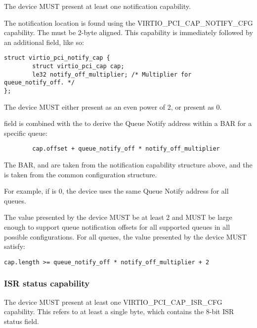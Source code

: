 The device MUST present at least one notification capability.

The notification location is found using the VIRTIO_PCI_CAP_NOTIFY_CFG
capability.  The  must be 2-byte aligned.  This capability is immediately followed by an additional
field, like so:

\begin{lstlisting}
struct virtio_pci_notify_cap {
        struct virtio_pci_cap cap;
        le32 notify_off_multiplier; /* Multiplier for queue_notify_off. */
};
\end{lstlisting}

The device MUST either present  as an even power of 2,
or present  as 0.

 field is combined with the  to
derive the Queue Notify address within a BAR for a specific queue:

\begin{lstlisting}
        cap.offset + queue_notify_off * notify_off_multiplier
\end{lstlisting}

The BAR,  and  are taken from the
notification capability structure above, and the  is
taken from the common configuration structure.

For example, if  is 0, the device uses
the same Queue Notify address for all queues.

The value  presented by the device MUST be at least 2
and MUST be large enough to support queue notification offsets
for all supported queues in all possible configurations.
For all queues, the value  presented by the device MUST satisfy:
\begin{lstlisting}
cap.length >= queue_notify_off * notify_off_multiplier + 2
\end{lstlisting}

\subsubsection{ISR status capability}\label{sec:Virtio Transport Options / Virtio Over PCI Bus / PCI Device Layout / ISR status capability}

The device MUST present at least one VIRTIO_PCI_CAP_ISR_CFG capability.  This
refers to at least a single byte, which contains the 8-bit ISR status field.

